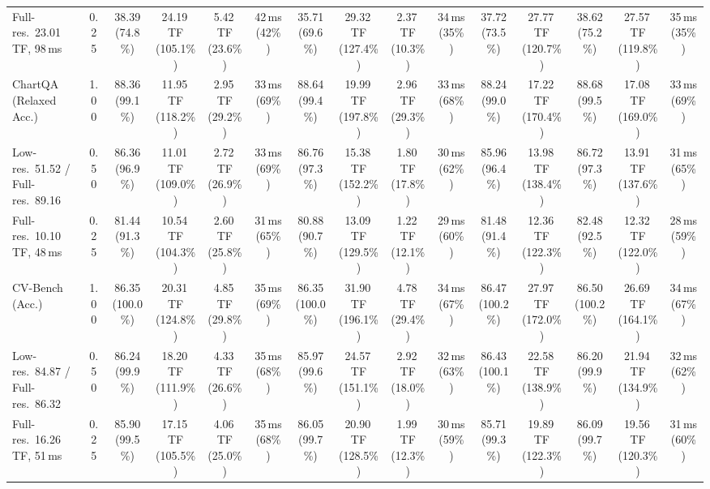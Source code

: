 \begin{table}[t]
{\begin{tabular}{l c | c c c c | c c c c | c c | c c c}
{\footnotesize Full-res.\ 23.01\,TF, 98\,ms} & 0.25 & 38.39 (74.8\%) & 24.19\,TF (105.1\%) & 5.42\,TF (23.6\%) & 42\,ms (42\%) & 35.71 (69.6\%) & 29.32\,TF (127.4\%) & 2.37\,TF (10.3\%) & 34\,ms (35\%) & 37.72 (73.5\%) & 27.77\,TF (120.7\%) & 38.62 (75.2\%) & 27.57\,TF (119.8\%) & 35\,ms (35\%) \\
\cmidrule(lr){1-15}
ChartQA (Relaxed Acc.) & 1.00 & \cellcolor{gray!15}88.36 (99.1\%) & 11.95\,TF (118.2\%) & 2.95\,TF (29.2\%) & 33\,ms (69\%) & \cellcolor{gray!15}88.64 (99.4\%) & 19.99\,TF (197.8\%) & 2.96\,TF (29.3\%) & 33\,ms (68\%) & \cellcolor{gray!15}88.24 (99.0\%) & 17.22\,TF (170.4\%) & \cellcolor{gray!15}88.68 (99.5\%) & 17.08\,TF (169.0\%) & 33\,ms (69\%) \\
{\footnotesize Low-res.\ 51.52 / Full-res.\ 89.16} & 0.50 & 86.36 (96.9\%) & 11.01\,TF (109.0\%) & 2.72\,TF (26.9\%) & 33\,ms (69\%) & 86.76 (97.3\%) & 15.38\,TF (152.2\%) & 1.80\,TF (17.8\%) & 30\,ms (62\%) & 85.96 (96.4\%) & 13.98\,TF (138.4\%) & 86.72 (97.3\%) & 13.91\,TF (137.6\%) & 31\,ms (65\%) \\
{\footnotesize Full-res.\ 10.10\,TF, 48\,ms} & 0.25 & 81.44 (91.3\%) & 10.54\,TF (104.3\%) & 2.60\,TF (25.8\%) & 31\,ms (65\%) & 80.88 (90.7\%) & 13.09\,TF (129.5\%) & 1.22\,TF (12.1\%) & 29\,ms (60\%) & 81.48 (91.4\%) & 12.36\,TF (122.3\%) & 82.48 (92.5\%) & 12.32\,TF (122.0\%) & 28\,ms (59\%) \\
\cmidrule(lr){1-15}
CV-Bench (Acc.) & 1.00 & \cellcolor{gray!15}86.35 (100.0\%) & 20.31\,TF (124.8\%) & 4.85\,TF (29.8\%) & 35\,ms (69\%) & \cellcolor{gray!15}86.35 (100.0\%) & 31.90\,TF (196.1\%) & 4.78\,TF (29.4\%) & 34\,ms (67\%) & \cellcolor{gray!15}86.47 (100.2\%) & 27.97\,TF (172.0\%) & \cellcolor{gray!15}86.50 (100.2\%) & 26.69\,TF (164.1\%) & 34\,ms (67\%) \\
{\footnotesize Low-res.\ 84.87 / Full-res.\ 86.32} & 0.50 & \cellcolor{gray!15}86.24 (99.9\%) & 18.20\,TF (111.9\%) & 4.33\,TF (26.6\%) & 35\,ms (68\%) & \cellcolor{gray!15}85.97 (99.6\%) & 24.57\,TF (151.1\%) & 2.92\,TF (18.0\%) & 32\,ms (63\%) & \cellcolor{gray!15}86.43 (100.1\%) & 22.58\,TF (138.9\%) & \cellcolor{gray!15}86.20 (99.9\%) & 21.94\,TF (134.9\%) & 32\,ms (62\%) \\
{\footnotesize Full-res.\ 16.26\,TF, 51\,ms} & 0.25 & \cellcolor{gray!15}85.90 (99.5\%) & 17.15\,TF (105.5\%) & 4.06\,TF (25.0\%) & 35\,ms (68\%) & \cellcolor{gray!15}86.05 (99.7\%) & 20.90\,TF (128.5\%) & 1.99\,TF (12.3\%) & 30\,ms (59\%) & \cellcolor{gray!15}85.71 (99.3\%) & 19.89\,TF (122.3\%) & \cellcolor{gray!15}86.09 (99.7\%) & 19.56\,TF (120.3\%) & 31\,ms (60\%) \\

\end{tabular}}
\end{table}
